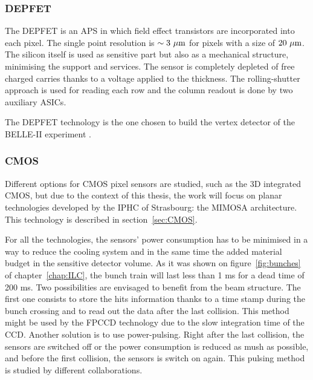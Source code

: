    \subsubsection{DEPFET}
    
    The \gls{DEPFET} \cite{Richter2003} is an \gls{APS} in which field effect transistors are incorporated into each pixel.
    The single point resolution is $\sim 3~\rm{\mu m}$ for pixels with a size of $20~\rm{\mu m}$.
    The silicon itself is used as sensitive part but also as a mechanical structure, minimising the support and services.
    The sensor is completely depleted of free charged carries thanks to a voltage applied to the thickness.
    The rolling-shutter approach is used for reading each row and the column readout is done by two auxiliary \glspl{ASIC}.

    The \gls{DEPFET} technology is the one chosen  to build the vertex detector of the BELLE-II experiment \cite{depfetBelleII}.

   \subsubsection{CMOS}

   Different options for \gls{CMOS} pixel sensors are studied, such as the 3D integrated \gls{CMOS}, but due to the context of this thesis, the work will focus on planar technologies developed by the \gls{IPHC} of Strasbourg: the \gls{MIMOSA} architecture. 
   This technology is described in section~\ref{sec:CMOS}.

   For all the technologies, the sensors' power consumption has to be minimised in a way to reduce the cooling system and in the same time the added material budget in the sensitive detector volume.
   As it was shown on figure~\ref{fig:bunches} of chapter~\ref{chap:ILC}, the bunch train will last less than 1 ms for a dead time of 200 ms.
   Two possibilities are envisaged to benefit from the beam structure.
   The first one consists to store the hits information thanks to a time stamp during the bunch crossing and to read out the data after the last collision.
   This method might be used by the \gls{FPCCD} technology due to the slow integration time of the \gls{CCD}.
   Another solution is to use power-pulsing.
   Right after the last collision, the sensors are switched off or the power consumption is reduced as mush as possible, and before the first collision, the sensors is switch on again.
   This pulsing method is studied by different collaborations. 
   
